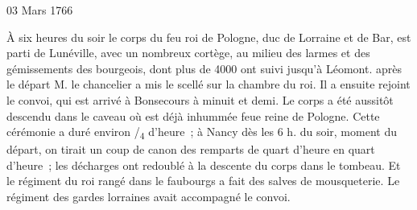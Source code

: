                      \begin{diary}{03 Mars 1766}{}
                        
                         À six heures du soir le corps du
                           feu roi de Pologne, duc de
                           Lorraine et
                           de Bar, est parti de Lunéville, avec
                           un nombreux cortège, au milieu des larmes et des gémissements des bourgeois, dont plus
                           de 4000 ont suivi jusqu'à Léomont.
                           après le départ M. le
                              chancelier a mis
                           le scellé sur la chambre du roi. Il a ensuite
                           rejoint le convoi, qui est arrivé à Bonsecours
                           à minuit et demi. Le corps a été aussitôt
                           descendu dans le caveau où est déjà inhummée
                           feue reine de Pologne.
                           Cette cérémonie
                           a duré environ /\textsubscript{4}
                           d'heure ; à Nancy dès
                           les 6 h. du soir, moment du départ, on tirait
                           un coup de canon des remparts de quart
                           d'heure en quart d'heure ; les décharges ont
                           redoublé à la descente du corps dans le tombeau.
                           Et le régiment du roi rangé dans le faubourgs
                           a fait des salves de mousqueterie. Le
                              régiment des gardes lorraines avait accompagné
                           le convoi. \bigskip
        
        
                     \end{diary}

